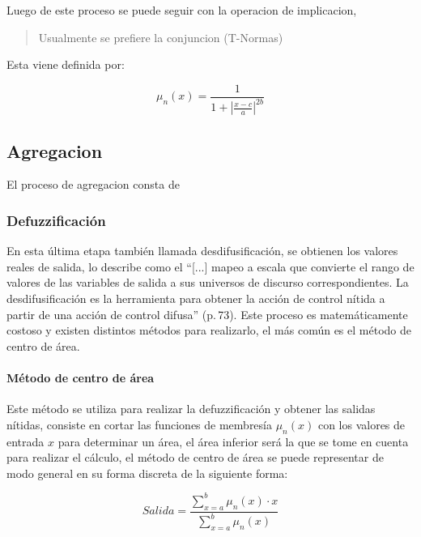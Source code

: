             Luego de este proceso se puede seguir con la operacion de implicacion, \blockquote[{\cite[p.16]{riid2003transparent}}]{Usualmente se prefiere la conjuncion (T-Normas)}. Esta viene definida por:

            \begin{equation}\label{eq:implicacion}
                \mu_n(x) = \frac{1}{1+ \left|\frac{x - c}{a}\right|^{2b}}
            \end{equation}

        
        \subsection{Agregacion}

            El proceso de agregacion consta de 


        \subsubsection{Defuzzificación}

            En esta última etapa también llamada desdifusificación, se obtienen los valores reales de salida, \textcite{cruz2010inteligencia} lo describe como el \enquote{[...] mapeo a escala que convierte el rango de valores de las variables de salida a sus universos de discurso correspondientes. La desdifusificación es la herramienta para obtener la acción de control nítida a partir de una acción de control difusa} (p.$\,$73). Este proceso es matemáticamente costoso y existen distintos métodos para realizarlo, el más común es el método de centro de área.
            
            \paragraph{Método de centro de área}

                Este método se utiliza para realizar la defuzzificación y obtener las salidas nítidas, consiste en cortar las funciones de membresía $\mu_{n}(x)$ con los valores de entrada $x$ para determinar un área, el área inferior será la que se tome en cuenta para realizar el cálculo, el método de centro de área se puede representar de modo general en su forma discreta de la siguiente forma:
                
                \begin{equation}\label{eq:Centroide}
                    Salida = \frac{\displaystyle\sum\limits_{x=a}^{b}\mu_{n}(x)\cdot x}{\displaystyle\sum\limits_{x=a}^{b}\mu_{n}(x)}
                \end{equation}
    
